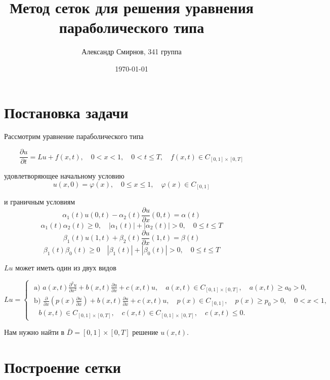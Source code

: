 \documentclass[a4paper,12pt]{article}
\author{Александр Смирнов, 341 группа}
\title{Метод сеток для решения уравнения параболического типа}
\date{\today}
\begin{document}
 

\maketitle

\section{Постановка задачи}

    Рассмотрим уравнение параболического типа

    $$\frac{\partial u}{\partial t}=L u + f(x, t), \quad 0<x<1, \quad 0<t \leq T, \quad f(x, t) \in C_{[0,1] \times[0, T]} $$

    удовлетворяющее начальному условию
    $$ u(x, 0)=\varphi(x), \quad 0 \leq x \leq 1, \quad \varphi(x) \in C_{[0,1]} $$ 

    и граничным условиям
    $$\alpha_{1}(t) u(0, t)-\alpha_{2}(t) \frac{\partial u}{\partial x}(0, t)=\alpha(t)$$
    $$\alpha_{1}(t) \alpha_{2}(t) \geq 0, \quad\left|\alpha_{1}(t)\right|+\left|\alpha_{2}(t)\right|>0, \quad 0 \leq t \leq T $$
    $$\beta_{1}(t) u(1, t)+\beta_{2}(t) \frac{\partial u}{\partial x}(1, t)=\beta(t)$$ 
    $$\beta_{1}(t) \beta_{0}(t) \geq 0 \quad\left|\beta_{1}(t)\right|+\left|\beta_{0}(t)\right|>0, \quad 0 \leq t \leq T$$

    $L u$ может иметь один из двух видов


    $$L u=
    \begin{cases}

        \text { a) } a(x, t) \frac{\partial^{2} u}{\partial x^{2}}+b(x, t) \frac{\partial u}{\partial x}+c(x, t) u, \quad a(x, t) \in C_{[0,1] \times[0, T]},\quad a(x, t) \geq a_{0}>0, 
        \\
        \text { b) } \frac{\partial}{\partial x}\left(p(x) \frac{\partial u}{\partial x}\right)+b(x, t) \frac{\partial u}{\partial x}+c(x, t) u, \quad p(x) \in C_{[0,1]}, \quad p(x) \geq p_{0}>0, \quad 0<x<1, 
        \\
        \quad b(x, t) \in C_{[0,1] \times[0, T]}, \quad c(x, t) \in C_{[0,1] \times[0, T]}, \quad c(x, t) \leq 0.

    \end{cases}$$

    Нам нужно найти в $\bar{D}=[0,1] \times[0, T]$ решение $u(x, t)$.

\section{Построение сетки}
\end{document}
